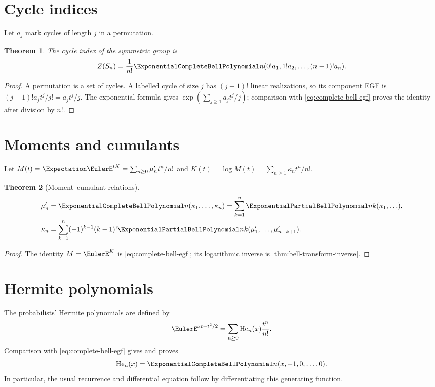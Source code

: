 \documentclass[11pt,a4paper,oneside,openany]{book}
\newtheorem{theorem}{Theorem}[chapter]
\theoremstyle{definition}
\theoremstyle{remark}
\begin{document}
\section{Cycle indices}
Let $a_j$ mark cycles of length $j$ in a permutation.
\begin{theorem}\label{thm:cycle-index-bell}
The cycle index of the symmetric group is
\begin{equation}\label{eq:cycle-index-bell}
 Z(S_n)=\frac1{n!}\ExponentialCompleteBellPolynomial n(0!a_1,1!a_2,\ldots,(n-1)!a_n).
\end{equation}
\end{theorem}
\begin{proof}
A permutation is a set of cycles.  A labelled cycle of size $j$ has $(j-1)!$
linear realizations, so its component EGF is $(j-1)!a_jt^j/j!=a_jt^j/j$.
The exponential formula gives
$\exp(\sum_{j\ge1}a_jt^j/j)$; comparison with
\eqref{eq:complete-bell-egf} proves the identity after division by $n!$.
\end{proof}

\section{Moments and cumulants}
Let $M(t)=\Expectation \EulerE^{tX}=\sum_{n\ge0}\mu'_nt^n/n!$ and
$K(t)=\log M(t)=\sum_{n\ge1}\kappa_nt^n/n!$.
\begin{theorem}[Moment--cumulant relations]\label{thm:moment-cumulant}
\begin{align}
 \mu'_n&=\ExponentialCompleteBellPolynomial n(\kappa_1,\ldots,\kappa_n)
 =\sum_{k=1}^{n}\ExponentialPartialBellPolynomial nk(\kappa_1,\ldots),
 \label{eq:moments-from-cumulants}\\
 \kappa_n&=\sum_{k=1}^{n}(-1)^{k-1}(k-1)!
 \ExponentialPartialBellPolynomial nk(\mu'_1,\ldots,\mu'_{n-k+1}).
 \label{eq:cumulants-from-moments}
\end{align}
\end{theorem}
\begin{proof}
The identity $M=\EulerE^K$ is \eqref{eq:complete-bell-egf}; its logarithmic inverse is
\cref{thm:bell-transform-inverse}.
\end{proof}

\section{Hermite polynomials}
The probabilists' Hermite polynomials are defined by
\[
 \EulerE^{xt-t^2/2}=\sum_{n\ge0}\operatorname{He}_n(x)\frac{t^n}{n!}.
\]
Comparison with \eqref{eq:complete-bell-egf} gives and proves
\begin{equation}\label{eq:hermite-bell}
 \operatorname{He}_n(x)=\ExponentialCompleteBellPolynomial n(x,-1,0,\ldots,0).
\end{equation}
In particular, the usual recurrence and differential equation follow by
differentiating this generating function.
\end{document}
